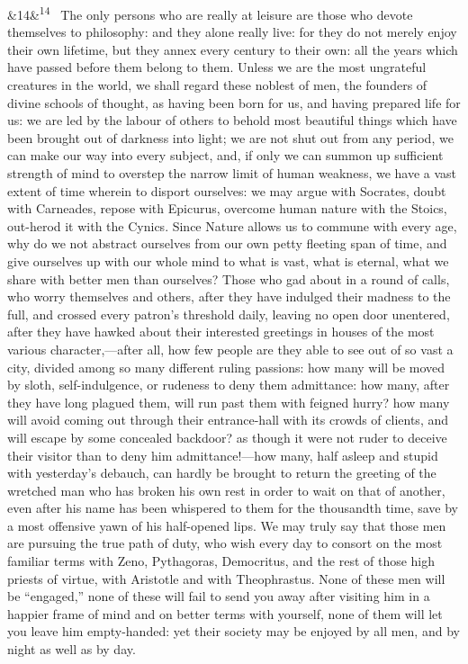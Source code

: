 \documentclass[12pt]{article}
\newcommand{\para}[1][]{\par\noindent\ifx&#1&\else\textsuperscript{\footnotesize #1}~\fi}
\begin{document}
\para[14] The only persons who are really at leisure are those who devote themselves to philosophy: and they alone really live: for they do not merely enjoy their own lifetime, but they annex every century to their own: all the years which have passed before them belong to them. Unless we are the most ungrateful creatures in the world, we shall regard these noblest of men, the founders of divine schools of thought, as having been born for us, and having prepared life for us: we are led by the labour of others to behold most beautiful things which have been brought out of darkness into light; we are not shut out from any period, we can make our way into every subject, and, if only we can summon up sufficient strength of mind to overstep the narrow limit of human weakness, we have a vast extent of time wherein to disport ourselves: we may argue with Socrates, doubt with Carneades, repose with Epicurus, overcome human nature with the Stoics, out-herod it with the Cynics. Since Nature allows us to commune with every age, why do we not abstract ourselves from our own petty fleeting span of time, and give ourselves up with our whole mind to what is vast, what is eternal, what we share with better men than ourselves? Those who gad about in a round of calls, who worry themselves and others, after they have indulged their madness to the full, and crossed every patron’s threshold daily, leaving no open door unentered, after they have hawked about their interested greetings in houses of the most various character,—after all, how few people are they able to see out of so vast a city, divided among so many different ruling passions: how many will be moved by sloth, self-indulgence, or rudeness to deny them admittance: how many, after they have long plagued them, will run past them with feigned hurry? how many will avoid coming out through their entrance-hall with its crowds of clients, and will escape by some concealed backdoor? as though it were not ruder to deceive their visitor than to deny him admittance!—how many, half asleep and stupid with yesterday’s debauch, can hardly be brought to return the greeting of the wretched man who has broken his own rest in order to wait on that of another, even after his name has been whispered to them for the thousandth time, save by a most offensive yawn of his half-opened lips. We may truly say that those men are pursuing the true path of duty, who wish every day to consort on the most familiar terms with Zeno, Pythagoras, Democritus, and the rest of those high priests of virtue, with Aristotle and with Theophrastus. None of these men will be “engaged,” none of these will fail to send you away after visiting him in a happier frame of mind and on better terms with yourself, none of them will let you leave him empty-handed: yet their society may be enjoyed by all men, and by night as well as by day.
\end{document}
